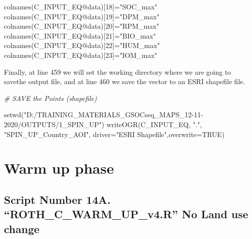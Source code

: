 \documentclass[
  10pt,
  b5paper,
]{book}
\newenvironment{Shaded}{\begin{snugshade}}{\end{snugshade}}
\newcommand{\AttributeTok}[1]{\textcolor[rgb]{0.77,0.63,0.00}{#1}}
\newcommand{\CommentTok}[1]{\textcolor[rgb]{0.56,0.35,0.01}{\textit{#1}}}
\newcommand{\ConstantTok}[1]{\textcolor[rgb]{0.00,0.00,0.00}{#1}}
\newcommand{\DecValTok}[1]{\textcolor[rgb]{0.00,0.00,0.81}{#1}}
\newcommand{\FunctionTok}[1]{\textcolor[rgb]{0.00,0.00,0.00}{#1}}
\newcommand{\NormalTok}[1]{#1}
\newcommand{\OtherTok}[1]{\textcolor[rgb]{0.56,0.35,0.01}{#1}}
\newcommand{\SpecialCharTok}[1]{\textcolor[rgb]{0.00,0.00,0.00}{#1}}
\newcommand{\StringTok}[1]{\textcolor[rgb]{0.31,0.60,0.02}{#1}}
\begin{document}
\begin{Shaded}
\begin{Highlighting}[]
\FunctionTok{colnames}\NormalTok{(C\_INPUT\_EQ}\SpecialCharTok{@}\NormalTok{data)[}\DecValTok{18}\NormalTok{]}\OtherTok{=}\StringTok{"SOC\_max"}
\FunctionTok{colnames}\NormalTok{(C\_INPUT\_EQ}\SpecialCharTok{@}\NormalTok{data)[}\DecValTok{19}\NormalTok{]}\OtherTok{=}\StringTok{"DPM\_max"}
\FunctionTok{colnames}\NormalTok{(C\_INPUT\_EQ}\SpecialCharTok{@}\NormalTok{data)[}\DecValTok{20}\NormalTok{]}\OtherTok{=}\StringTok{"RPM\_max"}
\FunctionTok{colnames}\NormalTok{(C\_INPUT\_EQ}\SpecialCharTok{@}\NormalTok{data)[}\DecValTok{21}\NormalTok{]}\OtherTok{=}\StringTok{"BIO\_max"}
\FunctionTok{colnames}\NormalTok{(C\_INPUT\_EQ}\SpecialCharTok{@}\NormalTok{data)[}\DecValTok{22}\NormalTok{]}\OtherTok{=}\StringTok{"HUM\_max"}
\FunctionTok{colnames}\NormalTok{(C\_INPUT\_EQ}\SpecialCharTok{@}\NormalTok{data)[}\DecValTok{23}\NormalTok{]}\OtherTok{=}\StringTok{"IOM\_max"}
\end{Highlighting}
\end{Shaded}

Finally, at line 459 we will set the working directory where we are going to savethe output file, and at line 460 we save the vector to an ESRI shapefile file.

\begin{Shaded}
\begin{Highlighting}[]
\CommentTok{\# SAVE the Points (shapefile)}

\FunctionTok{setwd}\NormalTok{(}\StringTok{"D:/TRAINING\_MATERIALS\_GSOCseq\_MAPS\_12{-}11{-}2020/OUTPUTS/1\_SPIN\_UP"}\NormalTok{)}
\FunctionTok{writeOGR}\NormalTok{(C\_INPUT\_EQ, }\StringTok{"."}\NormalTok{, }\StringTok{"SPIN\_UP\_Country\_AOI"}\NormalTok{, }\AttributeTok{driver=}\StringTok{"ESRI Shapefile"}\NormalTok{,}\AttributeTok{overwrite=}\ConstantTok{TRUE}\NormalTok{)}
\end{Highlighting}
\end{Shaded}

\hypertarget{warm-up-phase}{%
\section{Warm up phase}\label{warm-up-phase}}

\hypertarget{script-number-14a.-roth_c_warm_up_v4.r-no-land-use-change}{%
\subsection{Script Number 14A. ``ROTH\_C\_WARM\_UP\_v4.R'' No Land use change}\label{script-number-14a.-roth_c_warm_up_v4.r-no-land-use-change}}
\end{document}
